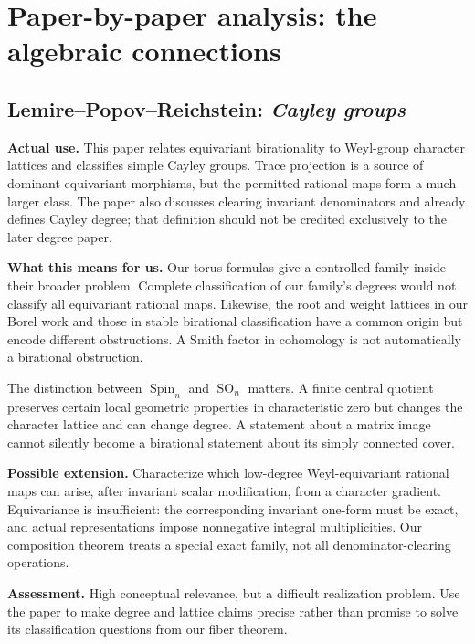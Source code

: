 \section{Paper-by-paper analysis: the algebraic connections}
\subsection{Lemire--Popov--Reichstein: \emph{Cayley groups}}

\textbf{Actual use.} This paper relates equivariant birationality to Weyl-group character lattices and classifies simple Cayley groups. Trace projection is a source of dominant equivariant morphisms, but the permitted rational maps form a much larger class. The paper also discusses clearing invariant denominators and already defines Cayley degree; that definition should not be credited exclusively to the later degree paper.

\textbf{What this means for us.} Our torus formulas give a controlled family inside their broader problem. Complete classification of our family's degrees would not classify all equivariant rational maps. Likewise, the root and weight lattices in our Borel work and those in stable birational classification have a common origin but encode different obstructions. A Smith factor in cohomology is not automatically a birational obstruction.

The distinction between $\operatorname{Spin}_n$ and $\operatorname{SO}_n$ matters. A finite central quotient preserves certain local geometric properties in characteristic zero but changes the character lattice and can change degree. A statement about a matrix image cannot silently become a birational statement about its simply connected cover.

\textbf{Possible extension.} Characterize which low-degree Weyl-equivariant rational maps can arise, after invariant scalar modification, from a character gradient. Equivariance is insufficient: the corresponding invariant one-form must be exact, and actual representations impose nonnegative integral multiplicities. Our composition theorem treats a special exact family, not all denominator-clearing operations.

\textbf{Assessment.} High conceptual relevance, but a difficult realization problem. Use the paper to make degree and lattice claims precise rather than promise to solve its classification questions from our fiber theorem.

